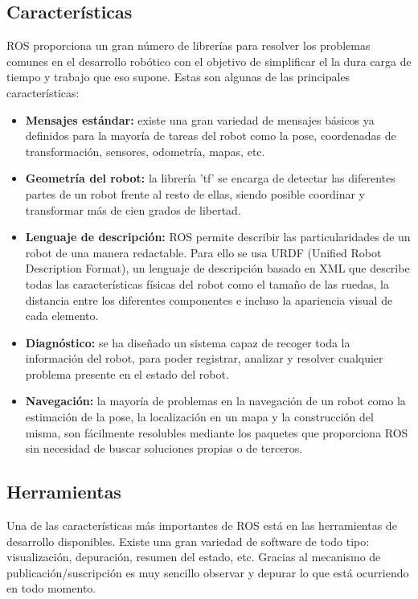 \subsection{Características}

ROS proporciona un gran número de librerías para resolver los problemas comunes
en el desarrollo robótico con el objetivo de simplificar el la dura carga de
tiempo y trabajo que eso supone. Estas son algunas de las principales
características:

\begin{itemize}
  \item \textbf{Mensajes estándar:} existe una gran variedad de mensajes básicos
  ya definidos para la mayoría de tareas del robot como la pose, coordenadas de
  transformación, sensores, odometría, mapas, etc. 
  \item \textbf{Geometría del robot:} la librería 'tf' se encarga de detectar
  las diferentes partes de un robot frente al resto de ellas, siendo posible
  coordinar y transformar más de cien grados de libertad.
  \item \textbf{Lenguaje de descripción:} ROS permite describir las
  particularidades de un robot de una manera redactable. Para ello se usa URDF
  (Unified Robot Description Format), un lenguaje de descripción basado en XML
  que describe todas las características físicas del robot como el tamaño de las
  ruedas, la distancia entre los diferentes componentes e incluso la apariencia
  visual de cada elemento.
  \item \textbf{Diagnóstico:} se ha diseñado un sistema capaz de recoger toda la
  información del robot, para poder registrar, analizar y resolver cualquier
  problema presente en el estado del robot.
  \item \textbf{Navegación:} la mayoría de problemas en la navegación de un
  robot como la estimación de la pose, la localización en un mapa y la
  construcción del misma, son fácilmente resolubles mediante los paquetes que
  proporciona ROS sin necesidad de buscar soluciones propias o de terceros.
\end{itemize}

\subsection{Herramientas}
Una de las características más importantes de ROS está en las herramientas de
desarrollo disponibles. Existe una gran variedad de software de todo tipo:
visualización, depuración, resumen del estado, etc. Gracias al mecanismo de
publicación/suscripción es muy sencillo observar y depurar lo que está
ocurriendo en todo momento.

